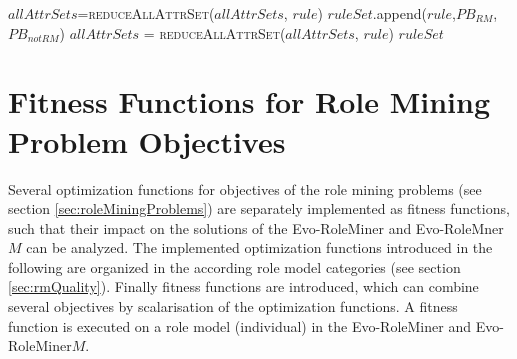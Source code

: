 \begin{algorithm}
\begin{algorithmic}[1]
                                                \State $allAttrSets$=\textsc{reduceAllAttrSet}($allAttrSets$, $rule$)
                                            \EndIf
                                        \EndFor
                                        \fi
                                    \EndIf
                                \Else
                                    \State $ruleSet$.append($rule$,$PB_{RM}$,$PB_{notRM}$)
                                        \State $allAttrSets$ = \textsc{reduceAllAttrSet}($allAttrSets$, $rule$)
                                    \EndIf
                                \EndIf
                            \EndIf
                        \EndWhile 
                    \EndWhile
                    \State \Return $ruleSet$
                \EndProcedure
            \end{algorithmic}
        \end{algorithm}
        
    \section{Fitness Functions for Role Mining Problem Objectives}
    \label{sec:optimizationFunctions}
    Several optimization functions for objectives of the role mining problems (see section \ref{sec:roleMiningProblems}) are separately implemented as fitness functions, such that their impact on the solutions of the Evo-RoleMiner and Evo-RoleMner$M$ can be analyzed. The implemented optimization functions introduced in the following are organized in the according role model categories (see section \ref{sec:rmQuality}). Finally fitness functions are introduced, which can combine several objectives by scalarisation of the optimization functions. A fitness function is executed on a role model (individual) in the Evo-RoleMiner and Evo-RoleMiner$M$.
